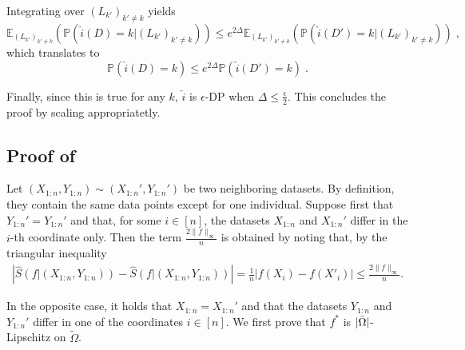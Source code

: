 \documentclass{article}
\theoremstyle{plain}
\theoremstyle{definition}
\theoremstyle{remark}
\newcommand{\Prob}[0]{\mathbb{P}}
\newcommand{\E}[0]{\mathbb{E}}
\newcommand\p[1]{\left( {#1}\right)}
\begin{document}
Integrating over $(L_{k'})_{k' \neq k}$ yields
\begin{equation}
    \E_{(L_{k'})_{k' \neq k}} \p{\Prob \p{\hat{i}(D) = k | (L_{k'})_{k' \neq k}}}
    \leq e^{2 \Delta} \E_{(L_{k'})_{k' \neq k}} \p{\Prob \p{\hat{i}(D') = k | (L_{k'})_{k' \neq k}}} \;,
\end{equation}
which translates to 
\begin{equation}
    \Prob \p{\hat{i}(D) = k}
    \leq e^{2 \Delta} \Prob \p{\hat{i}(D') = k }\;.
\end{equation}


Finally, since this is true for any $k$, $\hat{i}$ is $\epsilon$-DP when $\Delta \leq \frac{\epsilon}{2}$. This concludes the proof by scaling appropriatetly.

\subsection{Proof of }
\label{sec:proof_of_sensitivitysemidual}

Let $(X_{1:n}, Y_{1:n}) \sim (X_{1:n}', Y_{1:n}')$ be two neighboring datasets. 
By definition, they contain the same data points except for one individual. 
Suppose first that $Y_{1:n}' = Y_{1:n}'$ and that, for some $i\in [n]$, the datasets $X_{1:n}$ and $X_{1:n}'$ differ in the $i$-th coordinate only.
Then the term $\frac{2 \| f \|_{\infty} }{n}$ is obtained by noting that, by the triangular inequality
    \begin{align*}
        \left| \hat{S}(f | (X_{1:n}, Y_{1:n})) - \hat{S}(f | (X_{1:n}, Y_{1:n})) \right| = \frac{1}{n} \left|f(X_i) - f(X'_i)\right| \leq \frac{2 \| f \|_{\infty} }{n}.
    \end{align*}
    
    In the opposite case, it holds that $X_{1:n} = X_{1:n}'$ and that the datasets $Y_{1:n}$ and $Y_{1:n}'$ differ in one of the coordinates $i \in [n]$. 
     We first prove that $f^*$ is $| \Tilde{\Omega} |$-Lipschitz on $\tilde{\Omega}$.
\end{document}
